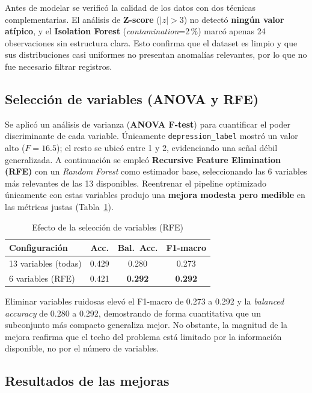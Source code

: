 \documentclass[11pt,twocolumn]{article}
\begin{document}
Antes de modelar se verific\'o la calidad de los datos con dos t\'ecnicas
complementarias. El an\'alisis de \textbf{Z-score} ($|z|>3$) no detect\'o
\textbf{ning\'un valor at\'ipico}, y el \textbf{Isolation Forest}
(\textit{contamination}=2\,\%) marc\'o apenas 24 observaciones sin
estructura clara. Esto confirma que el dataset es limpio y que sus
distribuciones casi uniformes no presentan anomal\'ias relevantes, por lo
que no fue necesario filtrar registros.

\subsection{Selecci\'on de variables (ANOVA y RFE)}

Se aplic\'o un an\'alisis de varianza (\textbf{ANOVA F-test}) para
cuantificar el poder discriminante de cada variable. \'Unicamente
\texttt{depression\_label} mostr\'o un valor alto ($F=16.5$); el resto se
ubic\'o entre 1 y 2, evidenciando una se\~nal d\'ebil generalizada. A
continuaci\'on se emple\'o \textbf{Recursive Feature Elimination (RFE)}
con un \textit{Random Forest} como estimador base, seleccionando las 6
variables m\'as relevantes de las 13 disponibles. Reentrenar el pipeline
optimizado \'unicamente con estas variables produjo una \textbf{mejora
modesta pero medible} en las m\'etricas justas (Tabla~\ref{tab:rfe}).

\begin{table}[H]
\centering
\caption{Efecto de la selecci\'on de variables (RFE)}
\label{tab:rfe}
\small
\begin{tabular}{lccc}
\toprule
\textbf{Configuraci\'on} & \textbf{Acc.} & \textbf{Bal.\ Acc.} & \textbf{F1-macro} \\
\midrule
\rowcolor{lightrow} 13 variables (todas) & 0.429 & 0.280 & 0.273 \\
6 variables (RFE)                        & 0.421 & \textbf{0.292} & \textbf{0.292} \\
\bottomrule
\end{tabular}
\end{table}

Eliminar variables ruidosas elev\'o el F1-macro de 0.273 a 0.292 y la
\textit{balanced accuracy} de 0.280 a 0.292, demostrando de forma
cuantitativa que un subconjunto m\'as compacto generaliza mejor. No
obstante, la magnitud de la mejora reafirma que el techo del problema
est\'a limitado por la informaci\'on disponible, no por el n\'umero de
variables.

\subsection{Resultados de las mejoras}
\end{document}

